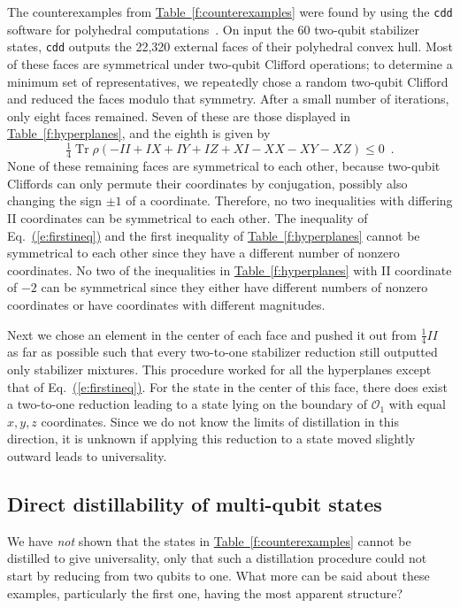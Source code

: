\documentclass[11pt]{article}
\DeclareMathOperator{\tr}{Tr}%
\newcommand{\beq}{\begin{equation}}
\newcommand{\eeq}{\end{equation}}
\theoremstyle{note}
\newcommand{\eqnref}[1]{\hyperref[#1]{{(\ref*{#1})}}}
\newcommand{\tabref}[1]{\hyperref[#1]{{Table~\ref*{#1}}}}
\begin{document}
The counterexamples from \tabref{f:counterexamples}
were found by using the {\tt cdd} software for polyhedral computations~\cite{Fukudacdd}.  On input the $60$ two-qubit stabilizer states, {\tt cdd} outputs the 22,320 external faces of their polyhedral convex hull.  Most of these faces are symmetrical under two-qubit Clifford operations; to determine a minimum set of representatives, we repeatedly chose a random two-qubit Clifford and reduced the faces modulo that symmetry.  After a small number of iterations, only eight faces remained.  Seven of these are those displayed in \tabref{f:hyperplanes}, and the eighth is given by
\beq \label{e:firstineq}
\tfrac{1}{4}\tr \rho(-II + IX + IY + IZ + XI - XX - XY - XZ) \leq 0
 \enspace .
\eeq
None of these remaining faces are symmetrical to each other, because two-qubit Cliffords can only permute their coordinates by conjugation, possibly also changing the sign $\pm 1$ of a coordinate.  Therefore, no two inequalities with differing II coordinates can be symmetrical to each other.  The inequality of Eq.~\eqnref{e:firstineq} and the first inequality of \tabref{f:hyperplanes} cannot be symmetrical to each other since they have a different number of nonzero coordinates.  No two of the inequalities in \tabref{f:hyperplanes} with II coordinate of $-2$ can be symmetrical since they either have different numbers of nonzero coordinates or have coordinates with different magnitudes.

Next we chose an element in the center of each face and pushed it out from $\tfrac{1}{4}II$ as far as possible such that every two-to-one stabilizer reduction still outputted only stabilizer mixtures.  This procedure worked for all the hyperplanes except that of Eq.~\eqnref{e:firstineq}.  For the state in the center of this face, there does exist a two-to-one reduction leading to a state lying on the boundary of $\mathcal O_1$ with equal $x,y,z$ coordinates.  Since we do not know the limits of distillation in this direction, it is unknown if applying this reduction to a state moved slightly outward leads to universality.


\subsection{Direct distillability of multi-qubit states}

We have \emph{not} shown that the states in \tabref{f:counterexamples} cannot be distilled to give universality, only that such a distillation procedure could not start by reducing from two qubits to one.  What more can be said about these examples, particularly the first one, having the most apparent structure?  
\end{document}
